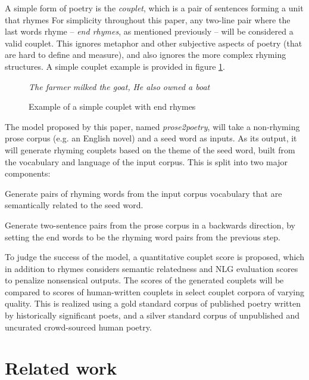 \documentclass[11pt,a4paper]{article}
\newenvironment{tight_enumerate}{
\begin{enumerate}
\setlength{\itemsep}{0pt}
\setlength{\parskip}{0pt}
}{\end{enumerate}}
\begin{document}
A simple form of poetry is the \textit{couplet}, which is a pair of sentences forming a unit that rhymes \cite{couplet_def} For simplicity throughout this paper, any two-line pair where the last words rhyme -- \textit{end rhymes}, as mentioned previously -- will be considered a valid couplet. This ignores metaphor and other subjective aspects of poetry (that are hard to define and measure), and also ignores the more complex rhyming structures. A simple couplet example is provided in figure \ref{fig:couplet_example}.

\begin{figure}
	\textit{The farmer milked the goat,} \newline
	\textit{He also owned a boat}
\caption{Example of a simple couplet with end rhymes}
\label{fig:couplet_example}
\end{figure}

The model proposed by this paper, named \textit{prose2poetry}, will take a non-rhyming prose corpus (e.g. an English novel) and a seed word as inputs. As its output, it will generate rhyming couplets based on the theme of the seed word, built from the vocabulary and language of the input corpus. This is split into two major components:
\begin{tight_enumerate}
	\vspace{-0.5em}
	\item
		Generate pairs of rhyming words from the input corpus vocabulary that are semantically related to the seed word.
	\item
		Generate two-sentence pairs from the prose corpus in a backwards direction, by setting the end words to be the rhyming word pairs from the previous step.
\end{tight_enumerate}
\vspace{-0.5em}

To judge the success of the model, a quantitative couplet score is proposed, which in addition to rhymes considers semantic relatedness and NLG evaluation scores to penalize nonsensical outputs. The scores of the generated couplets will be compared to scores of human-written couplets in select couplet corpora of varying quality. This is realized using a gold standard corpus of published poetry written by historically significant poets, and a silver standard corpus of unpublished and uncurated crowd-sourced human poetry.

\section{Related work}
\label{sec:related}
\end{document}
